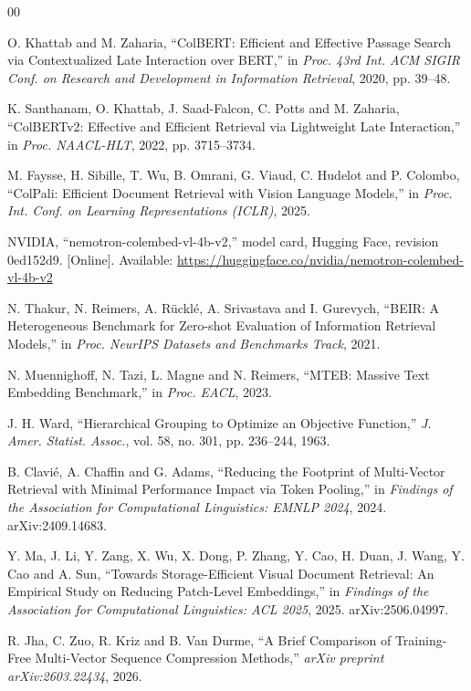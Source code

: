 \documentclass[conference]{IEEEtran}
\begin{document}
\begin{thebibliography}{00}

O. Khattab and M. Zaharia, ``ColBERT: Efficient and Effective Passage Search via
Contextualized Late Interaction over BERT,'' in \emph{Proc. 43rd Int. ACM SIGIR
Conf. on Research and Development in Information Retrieval}, 2020, pp. 39--48.

K. Santhanam, O. Khattab, J. Saad-Falcon, C. Potts and M. Zaharia, ``ColBERTv2:
Effective and Efficient Retrieval via Lightweight Late Interaction,'' in
\emph{Proc. NAACL-HLT}, 2022, pp. 3715--3734.

M. Faysse, H. Sibille, T. Wu, B. Omrani, G. Viaud, C. Hudelot and P. Colombo,
``ColPali: Efficient Document Retrieval with Vision Language Models,''
in \emph{Proc. Int. Conf. on Learning Representations (ICLR)}, 2025.

NVIDIA, ``nemotron-colembed-vl-4b-v2,'' model card, Hugging Face, revision
0ed152d9. [Online]. Available:
\url{https://huggingface.co/nvidia/nemotron-colembed-vl-4b-v2}

N. Thakur, N. Reimers, A. R\"uckl\'e, A. Srivastava and I. Gurevych, ``BEIR: A
Heterogeneous Benchmark for Zero-shot Evaluation of Information Retrieval Models,''
in \emph{Proc. NeurIPS Datasets and Benchmarks Track}, 2021.

N. Muennighoff, N. Tazi, L. Magne and N. Reimers, ``MTEB: Massive Text Embedding
Benchmark,'' in \emph{Proc. EACL}, 2023.

J. H. Ward, ``Hierarchical Grouping to Optimize an Objective Function,''
\emph{J. Amer. Statist. Assoc.}, vol. 58, no. 301, pp. 236--244, 1963.

B. Clavi\'e, A. Chaffin and G. Adams, ``Reducing the Footprint of Multi-Vector
Retrieval with Minimal Performance Impact via Token Pooling,'' in \emph{Findings
of the Association for Computational Linguistics: EMNLP 2024}, 2024.
arXiv:2409.14683.

Y. Ma, J. Li, Y. Zang, X. Wu, X. Dong, P. Zhang, Y. Cao, H. Duan, J. Wang,
Y. Cao and A. Sun, ``Towards Storage-Efficient Visual Document Retrieval: An
Empirical Study on Reducing Patch-Level Embeddings,'' in \emph{Findings of the
Association for Computational Linguistics: ACL 2025}, 2025. arXiv:2506.04997.

R. Jha, C. Zuo, R. Kriz and B. Van Durme, ``A Brief Comparison of Training-Free
Multi-Vector Sequence Compression Methods,'' \emph{arXiv preprint
arXiv:2603.22434}, 2026.


\end{thebibliography}
\end{document}
